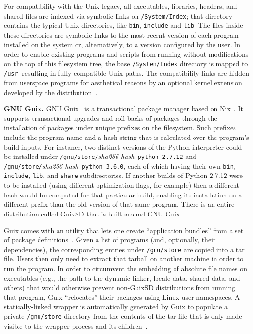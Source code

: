 \documentclass[sigplan, anonymous, 10pt]{acmart}
\begin{document}
For compatibility with the Unix legacy, all executables, libraries, headers, and shared
files are indexed via symbolic links on \texttt{/System/Index};
that directory contains the typical Unix directories, like \texttt{bin}, \texttt{include}
and \texttt{lib}. The files inside these directories are symbolic links to the
most recent version of each program installed on the system or, alternatively, to a version
configured by the user. In order to enable existing programs and scripts from running
without modifications on the top of this filesystem tree, the base \texttt{/System/Index}
directory is mapped to \texttt{/usr}, resulting in fully-compatible Unix paths.
The compatibility links are hidden from userspace programs for aesthetical reasons
by an optional kernel extension developed by the distribution~\cite{damasio2003:gobohide}.

\textbf{GNU Guix.}
GNU Guix~\cite{courtes2013:guix} is a transactional package manager based on Nix~\cite{dolstra2004:nix}.
It supports transactional upgrades and
roll-backs of packages through the installation of packages under unique prefixes on the filesystem.
Such prefixes include the program name and a hash string that is calculated over the program's
build inputs. For instance, two distinct versions of the Python interpreter could be installed
under \texttt{/gnu/store/}\textit{sha256-hash}\texttt{-python-2.7.12} and \texttt{/gnu/store/}\textit{sha256-hash}\texttt{-python-3.6.0},
each of which having their own \texttt{bin}, \texttt{include}, \texttt{lib}, and \texttt{share}
subdirectories. If another builds of Python 2.7.12 were to be installed (using different optimization
flags, for example) then a different hash would be computed for that particular build, enabling its
installation on a different prefix than the old version of that same program. There is an entire
distribution called GuixSD that is built around GNU Guix.

Guix comes with an utility that lets one create ``application bundles'' from a set of package
definitions~\cite{gnu2017:bundles}. Given a list of programs (and, optionally, their dependencies),
the corresponding entries under \texttt{/gnu/store} are copied into a tar file. Users then only
need to extract that tarball on another machine in order to run the program. In order to circumvent
the embedding of absolute file names on executables (e.g., the path to the dynamic linker, locale
data, shared data, and others) that would otherwise prevent non-GuixSD distributions from running
that program, Guix ``relocates'' their packages using Linux user namespaces. A statically-linked
wrapper is automatically generated by Guix to populate a private \texttt{/gnu/store} directory
from the contents of the tar file that is only made visible to the wrapper process and its
children~\cite{gnu2018:tarballs}.
\end{document}
